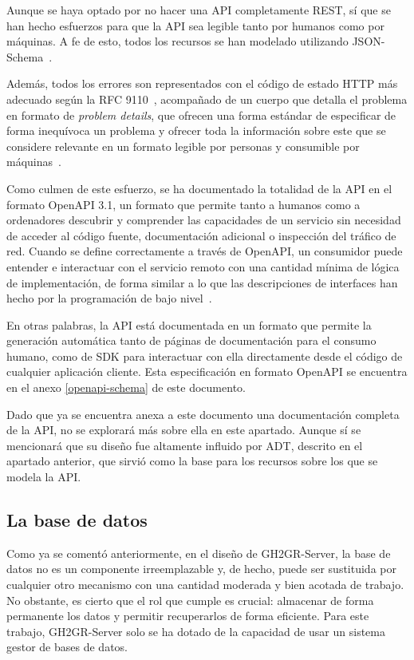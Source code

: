 Aunque se haya optado por no hacer una \acrshort{API} completamente \acrshort{REST}, sí que se han hecho esfuerzos para que la \acrshort{API} sea legible tanto por humanos como por máquinas. A fe de esto, todos los recursos se han modelado utilizando JSON-Schema~\cite{jsonschemaJSONSchema}. 

Además, todos los errores son representados con el código de estado \acrshort{HTTP} más adecuado según la RFC 9110~\cite{rfc9110}, acompañado de un cuerpo que detalla el problema en formato de \textit{problem details}, que ofrecen una forma estándar de especificar de forma inequívoca un problema y ofrecer toda la información sobre este que se considere relevante en un formato legible por personas y consumible por máquinas~\cite{rfc9457}. 

Como culmen de este esfuerzo, se ha documentado la totalidad de la \acrshort{API} en el formato OpenAPI 3.1, un formato que permite tanto a humanos como a ordenadores descubrir y comprender las capacidades de un servicio sin necesidad de acceder al código fuente, documentación adicional o inspección del tráfico de red. Cuando se define correctamente a través de OpenAPI, un consumidor puede entender e interactuar con el servicio remoto con una cantidad mínima de lógica de implementación, de forma similar a lo que las descripciones de interfaces han hecho por la programación de bajo nivel~\cite{openapisOpenAPISpecification}. 

En otras palabras, la \acrshort{API} está documentada en un formato que permite la generación automática tanto de páginas de documentación para el consumo humano, como de \acrshort{SDK} para interactuar con ella directamente desde el código de cualquier aplicación cliente. Esta especificación en formato OpenAPI se encuentra en el anexo \ref{openapi-schema} de este documento.

Dado que ya se encuentra anexa a este documento una documentación completa de la \acrshort{API}, no se explorará más sobre ella en este apartado. Aunque sí se mencionará que su diseño fue altamente influido por \acrshort{ADT}, descrito en el apartado anterior, que sirvió como la base para los recursos sobre los que se modela la \acrshort{API}.
\subsection{La base de datos}
Como ya se comentó anteriormente, en el diseño de GH2GR-Server, la base de datos no es un componente irreemplazable y, de hecho, puede ser sustituida por cualquier otro mecanismo con una cantidad moderada y bien acotada de trabajo. No obstante, es cierto que el rol que cumple es crucial: almacenar de forma permanente los datos y permitir recuperarlos de forma eficiente. Para este trabajo, GH2GR-Server solo se ha dotado de la capacidad de usar un sistema gestor de bases de datos.

